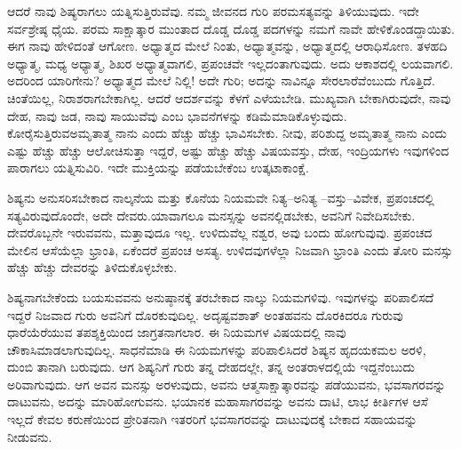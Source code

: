 ಆದರೆ ನಾವು ಶಿಷ್ಯರಾಗಲು ಯತ್ನಿಸುತ್ತಿರುವೆವು. ನಮ್ಮ ಜೀವನದ ಗುರಿ ಪರಮಸತ್ಯವನ್ನು ತಿಳಿಯುವುದು. ಇದೇ ಸರ್ವಶ್ರೇಷ್ಠ ಧೈಯ. ಪರಮ ಸಾಕ್ಷಾತ್ಕಾರ ಮುಂತಾದ ದೊಡ್ಡ ದೊಡ್ಡ ಪದಗಳನ್ನು ನಮಗೆ ನಾವೇ ಹೇಳಿಕೊಂಡದ್ದಾಯಿತು. ಈಗ ನಾವು ಹೇಳಿದಂತೆ ಆಗೋಣ. ಅಧ್ಯಾತ್ಮದ ಮೇಲೆ ನಿಂತು, ಅಧ್ಯಾತ್ಮವನ್ನು, ಅಧ್ಯಾತ್ಮದಲ್ಲಿ ಆರಾಧಿಸೋಣ. ತಳಹದಿ ಅಧ್ಯಾತ್ಮ, ಮಧ್ಯ ಅಧ್ಯಾತ್ಮ, ಶಿಖರ ಅಧ್ಯಾತ್ಮವಾಗಲಿ, ಪ್ರಪಂಚವೇ ಇಲ್ಲದಂತಾಗುವುದು. ಅದು ಆಕಾಶದಲ್ಲಿ ಲಯವಾಗಲಿ. ಅದರಿಂದ ಯಾರಿಗೇನು? ಅಧ್ಯಾತ್ಮದ ಮೇಲೆ ನಿಲ್ಲಿ! ಅದೇ ಗುರಿ; ಅದನ್ನು ನಾವಿನ್ನೂ ಸೇರಲಾರೆವೆಂಬುದು ಗೊತ್ತಿದೆ. ಚಿಂತೆಯಿಲ್ಲ, ನಿರಾಶರಾಗಬೇಕಾಗಿಲ್ಲ. ಆದರೆ ಆದರ್ಶವನ್ನು ಕೆಳಗೆ ಎಳೆಯಬೇಡಿ. ಮುಖ್ಯವಾಗಿ ಬೇಕಾಗಿರುವುದೇ, ನಾವು ದೇಹ, ನಾವು ಜಡ, ನಾವು ಸಾಯುವೆವು ಎಂಬ ಭಾವನೆಗಳನ್ನು ಕಡಿಮೆಮಾಡಿಕೊಳ್ಳುವುದು. ಕೋರೈಸುತ್ತಿರುವ\break ಅಮೃತಾತ್ಮ ನಾನು ಎಂದು ಹೆಚ್ಚು ಹೆಚ್ಚು ಭಾವಿಸಬೇಕು. ನೀವು, ಪರಿಶುದ್ದ ಅಮೃತಾತ್ಮ ನಾನು ಎಂದು ಎಷ್ಟು ಹೆಚ್ಚು ಹೆಚ್ಚು ಆಲೋಚಿಸುತ್ತಾ ಇದ್ದರೆ, ಅಷ್ಟು ಹೆಚ್ಚು ಹೆಚ್ಚು ವಿಷಯವಸ್ತು, ದೇಹ, ಇಂದ್ರಿಯಗಳು ಇವುಗಳಿಂದ ಪಾರಾಗಲು ಯತ್ನಿಸುವಿರಿ. ಇದೇ ಮುಕ್ತಿಯನ್ನು ಪಡೆಯಬೇಕೆಂಬ ಉತ್ಕಟಾಕಾಂಕ್ಷೆ.

ಶಿಷ್ಯನು ಅನುಸರಿಸಬೇಕಾದ ನಾಲ್ಕನೆಯ ಮತ್ತು ಕೊನೆಯ ನಿಯಮವೇ ನಿತ್ಯ–ಅನಿತ್ಯ –ವಸ್ತು–ವಿವೇಕ, ಪ್ರಪಂಚದಲ್ಲಿ ಸತ್ಯವಿರುವುದೊಂದೇ, ಅದೇ ದೇವರು.\break ಯಾವಾಗಲೂ ಮನಸ್ಸನ್ನು ಅವನಲ್ಲಿಡಬೇಕು, ಅವನಿಗೆ ನಿವೇದಿಸಬೇಕು. ದೇವರೊಬ್ಬನೇ ಇರುವವನು, ಮತ್ತಾವುದೂ ಇಲ್ಲ. ಉಳಿದುವೆಲ್ಲ ನಶ್ವರ, ಅವು ಬಂದು ಹೋಗುವುವು. ಪ್ರಪಂಚದ ಮೇಲಿನ ಆಸೆಯೆಲ್ಲಾ ಭ್ರಾಂತಿ, ಏಕೆಂದರೆ ಪ್ರಪಂಚ ಅಸತ್ಯ. ಉಳಿದವುಗಳೆಲ್ಲಾ ನಿಜವಾಗಿ ಭ್ರಾಂತಿ ಎಂದು ತೋರಿ ಮನಸ್ಸು ಹೆಚ್ಚು ಹೆಚ್ಚು ದೇವರನ್ನು ತಿಳಿದುಕೊಳ್ಳಬೇಕು.

ಶಿಷ್ಯನಾಗಬೇಕೆಂದು ಬಯಸುವವನು ಅನುಷ್ಠಾನಕ್ಕೆ ತರಬೇಕಾದ ನಾಲ್ಕು ನಿಯಮಗಳಿವು. ಇವುಗಳನ್ನು ಪರಿಪಾಲಿಸದೆ ಇದ್ದರೆ ನಿಜವಾದ ಗುರು ಅವನಿಗೆ ದೊರಕುವುದಿಲ್ಲ. ಅದೃಷ್ಟವಶಾತ್ ಅಂತಹವನು ದೊರಕಿದರೂ ಗುರುವು ಧಾರೆಯೆರೆಯುವ ತಪಶ್ಶಕ್ತಿಯಿಂದ ಜಾಗ್ರತನಾಗಲಾರ. ಈ ನಿಯಮಗಳ ವಿಷಯದಲ್ಲಿ ನಾವು ಚೌಕಾಸಿಮಾಡಲಾಗುವುದಿಲ್ಲ. ಸಾಧನೆಮಾಡಿ ಈ ನಿಯಮಗಳನ್ನು ಪರಿಪಾಲಿಸಿದರೆ ಶಿಷ್ಯನ ಹೃದಯಕಮಲ ಅರಳಿ, ದುಂಬಿ ತಾನಾಗಿ ಬರುವುದು. ಆಗ ಶಿಷ್ಯನಿಗೆ ಗುರು ತನ್ನ ದೇಹದಲ್ಲೇ, ತನ್ನ ಅಂತರಾಳದಲ್ಲಿಯೆ ಇದ್ದನೆಂಬುದು ಅರಿವಾಗುವುದು. ಆಗ ಅವನ ಮನಸ್ಸು ಅರಳುವುದು, ಅವನು ಆತ್ಮಸಾಕ್ಷಾತ್ಕಾರವನ್ನು ಪಡೆಯುವನು, ಭವಸಾಗರವನ್ನು ದಾಟುವನು, ಅದನ್ನು ಮಾರಿಹೋಗುವನು. ಭಯಾನಕ ಮಹಾಸಾಗರವನ್ನು ಅವನು ದಾಟಿ, ಲಾಭ ಕೀರ್ತಿಗಳ ಆಸೆ ಇಲ್ಲದೆ ಕೇವಲ ಕರುಣೆಯಿಂದ ಪ್ರೇರಿತನಾಗಿ ಇತರರಿಗೆ ಭವಸಾಗರವನ್ನು ದಾಟುವುದಕ್ಕೆ ಬೇಕಾದ ಸಹಾಯವನ್ನು ನೀಡುವನು.

